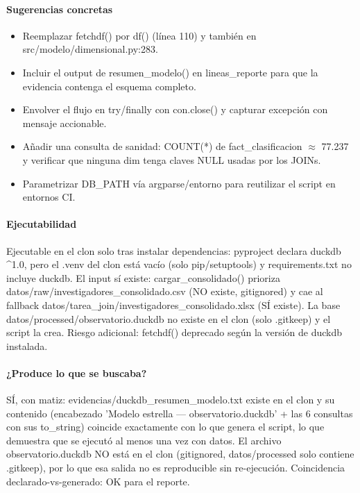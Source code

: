 \paragraph{Sugerencias concretas}
\begin{itemize}
  \item Reemplazar fetchdf() por df() (línea 110) y también en src/modelo/dimensional.py:283.
  \item Incluir el output de resumen\_modelo() en lineas\_reporte para que la evidencia contenga el esquema completo.
  \item Envolver el flujo en try/finally con con.close() y capturar excepción con mensaje accionable.
  \item Añadir una consulta de sanidad: COUNT(*) de fact\_clasificacion $\approx$ 77.237 y verificar que ninguna dim tenga claves NULL usadas por los JOINs.
  \item Parametrizar DB\_PATH vía argparse/entorno para reutilizar el script en entornos CI.
\end{itemize}

\paragraph{Ejecutabilidad}
Ejecutable en el clon solo tras instalar dependencias: pyproject declara duckdb \textasciicircum{}1.0, pero el .venv del clon está vacío (solo pip/setuptools) y requirements.txt no incluye duckdb. El input sí existe: cargar\_consolidado() prioriza datos/raw/investigadores\_consolidado.csv (NO existe, gitignored) y cae al fallback datos/tarea\_join/investigadores\_consolidado.xlsx (SÍ existe). La base datos/processed/observatorio.duckdb no existe en el clon (solo .gitkeep) y el script la crea. Riesgo adicional: fetchdf() deprecado según la versión de duckdb instalada.

\paragraph{¿Produce lo que se buscaba?}
SÍ, con matiz: evidencias/duckdb\_resumen\_modelo.txt existe en el clon y su contenido (encabezado 'Modelo estrella --- observatorio.duckdb' + las 6 consultas con sus to\_string) coincide exactamente con lo que genera el script, lo que demuestra que se ejecutó al menos una vez con datos. El archivo observatorio.duckdb NO está en el clon (gitignored, datos/processed solo contiene .gitkeep), por lo que esa salida no es reproducible sin re-ejecución. Coincidencia declarado-vs-generado: OK para el reporte.

